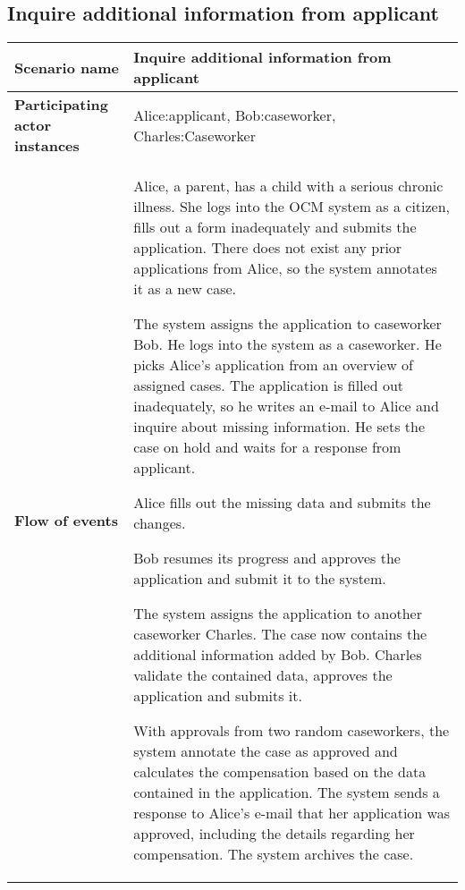 \subsection*{Inquire additional information from applicant}
\begin{table}[htb!]
\begin{tabularx}{\textwidth}{l|X}
	\textbf{Scenario name} & Inquire additional information from applicant \\
	\hline
	\textbf{Participating actor instances} & Alice:applicant, Bob:caseworker, Charles:Caseworker\\
	\hline
	\textbf{Flow of events} &
	\begin{compactenum}
	        \item Alice, a parent, has a child with a serious chronic illness. She logs into the OCM system as a citizen, fills out a form inadequately and submits the application. There does not exist any prior applications from Alice, so the system annotates it as a new case.
	        \item The system assigns the application to caseworker Bob. He logs into the system as a caseworker. He picks Alice's application from an overview of assigned cases. The application is filled out inadequately, so he writes an e-mail to Alice and inquire about missing information. He sets the case on hold and waits for a response from applicant.
	        \item Alice fills out the missing data and submits the changes. 
	        \item Bob resumes its progress and approves the application and submit it to the system.
	        \item The system assigns the application to another caseworker Charles. The case now contains the additional information added by Bob. Charles validate the contained data, approves the application and submits it.
	        \item With approvals from two random caseworkers, the system annotate the case as approved and calculates the compensation based on the data contained in the application. The system sends a response to Alice's e-mail that her application was approved, including the details regarding her compensation. The system archives the case.
	\end{compactenum}\\
	\hline
\end{tabularx}
\end{table}

\newpage
